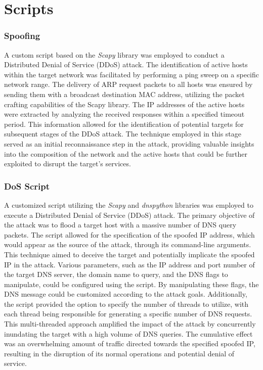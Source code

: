 \section{Scripts}
\subsubsection*{Spoofing}
A custom script based on the \textit{Scapy} library was employed to conduct a Distributed Denial of Service (DDoS) attack.
The identification of active hosts within the target network was facilitated by performing a ping sweep on a specific network range.
The delivery of ARP request packets to all hosts was ensured by sending them with a broadcast destination MAC address,
utilizing the packet crafting capabilities of the Scapy library.
The IP addresses of the active hosts were extracted by analyzing the received responses within a specified timeout period.
This information allowed for the identification of potential targets for subsequent stages of the DDoS attack.
The technique employed in this stage served as an initial reconnaissance step in the attack, providing valuable insights
into the composition of the network and the active hosts that could be further exploited to disrupt the target's services.

\subsubsection*{DoS Script}
A customized script utilizing the \textit{Scapy} and \textit{dnspython} libraries was employed to execute a Distributed Denial of Service (DDoS) attack.
The primary objective of the attack was to flood a target host with a massive number of DNS query packets. The script allowed for the specification
of the spoofed IP address, which would appear as the source of the attack, through its command-line arguments.
This technique aimed to deceive the target and potentially implicate the spoofed IP in the attack.
Various parameters, such as the IP address and port number of the target DNS server, the domain name to query,
and the DNS flags to manipulate, could be configured using the script.
By manipulating these flags, the DNS message could be customized according to the attack goals.
Additionally, the script provided the option to specify the number of threads to utilize,
with each thread being responsible for generating a specific number of DNS requests.
This multi-threaded approach amplified the impact of the attack by concurrently inundating the target with a high volume of DNS queries.
The cumulative effect was an overwhelming amount of traffic directed towards the specified spoofed IP,
resulting in the disruption of its normal operations and potential denial of service.